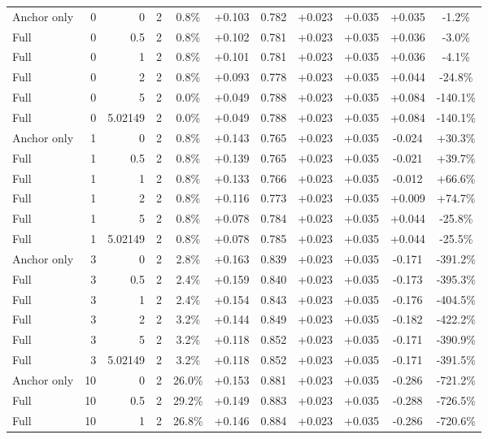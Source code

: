 \begin{table}[htbp]
\begin{tabular}{lrrrccccccc}
Anchor only & 0 & 0 & 2 & 0.8\% & +0.103 & 0.782 & +0.023 & +0.035 & +0.035 & -1.2\% \\
Full & 0 & 0.5 & 2 & 0.8\% & +0.102 & 0.781 & +0.023 & +0.035 & +0.036 & -3.0\% \\
Full & 0 & 1 & 2 & 0.8\% & +0.101 & 0.781 & +0.023 & +0.035 & +0.036 & -4.1\% \\
Full & 0 & 2 & 2 & 0.8\% & +0.093 & 0.778 & +0.023 & +0.035 & +0.044 & -24.8\% \\
Full & 0 & 5 & 2 & 0.0\% & +0.049 & 0.788 & +0.023 & +0.035 & +0.084 & -140.1\% \\
Full & 0 & 5.02149 & 2 & 0.0\% & +0.049 & 0.788 & +0.023 & +0.035 & +0.084 & -140.1\% \\
Anchor only & 1 & 0 & 2 & 0.8\% & +0.143 & 0.765 & +0.023 & +0.035 & -0.024 & +30.3\% \\
Full & 1 & 0.5 & 2 & 0.8\% & +0.139 & 0.765 & +0.023 & +0.035 & -0.021 & +39.7\% \\
Full & 1 & 1 & 2 & 0.8\% & +0.133 & 0.766 & +0.023 & +0.035 & -0.012 & +66.6\% \\
Full & 1 & 2 & 2 & 0.8\% & +0.116 & 0.773 & +0.023 & +0.035 & +0.009 & +74.7\% \\
Full & 1 & 5 & 2 & 0.8\% & +0.078 & 0.784 & +0.023 & +0.035 & +0.044 & -25.8\% \\
Full & 1 & 5.02149 & 2 & 0.8\% & +0.078 & 0.785 & +0.023 & +0.035 & +0.044 & -25.5\% \\
Anchor only & 3 & 0 & 2 & 2.8\% & +0.163 & 0.839 & +0.023 & +0.035 & -0.171 & -391.2\% \\
Full & 3 & 0.5 & 2 & 2.4\% & +0.159 & 0.840 & +0.023 & +0.035 & -0.173 & -395.3\% \\
Full & 3 & 1 & 2 & 2.4\% & +0.154 & 0.843 & +0.023 & +0.035 & -0.176 & -404.5\% \\
Full & 3 & 2 & 2 & 3.2\% & +0.144 & 0.849 & +0.023 & +0.035 & -0.182 & -422.2\% \\
Full & 3 & 5 & 2 & 3.2\% & +0.118 & 0.852 & +0.023 & +0.035 & -0.171 & -390.9\% \\
Full & 3 & 5.02149 & 2 & 3.2\% & +0.118 & 0.852 & +0.023 & +0.035 & -0.171 & -391.5\% \\
Anchor only & 10 & 0 & 2 & 26.0\% & +0.153 & 0.881 & +0.023 & +0.035 & -0.286 & -721.2\% \\
Full & 10 & 0.5 & 2 & 29.2\% & +0.149 & 0.883 & +0.023 & +0.035 & -0.288 & -726.5\% \\
Full & 10 & 1 & 2 & 26.8\% & +0.146 & 0.884 & +0.023 & +0.035 & -0.286 & -720.6\% \\

\end{tabular}
\end{table}
